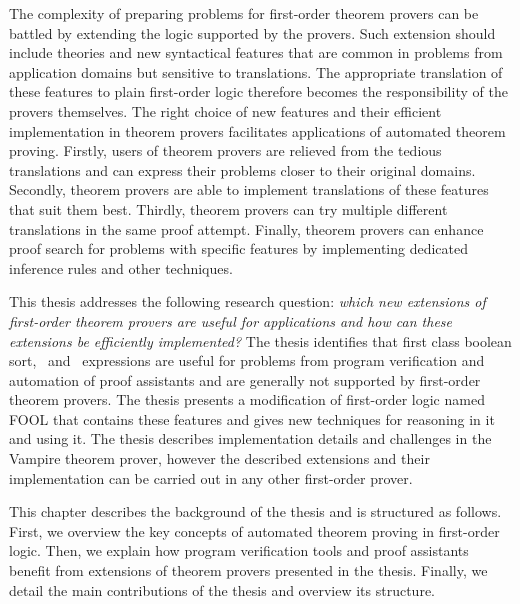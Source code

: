 The complexity of preparing problems for first-order theorem provers can be battled by extending the logic supported by the provers. Such extension should include theories and new syntactical features that are common in problems from application domains but sensitive to translations. The appropriate translation of these features to plain first-order logic therefore becomes the responsibility of the provers themselves. The right choice of new features and their efficient implementation in theorem provers facilitates applications of automated theorem proving. Firstly, users of theorem provers are relieved from the tedious translations and can express their problems closer to their original domains. Secondly, theorem provers are able to implement translations of these features that suit them best. Thirdly, theorem provers can try multiple different translations in the same proof attempt. Finally, theorem provers can enhance proof search for problems with specific features by implementing dedicated inference rules and other techniques.

This thesis addresses the following research question: \emph{which new extensions of first-order theorem provers are useful for applications and how can these extensions be efficiently implemented?} The thesis identifies that first class boolean sort, \ITE\ and \LETIN\ expressions are useful for problems from program verification and automation of proof assistants and are generally not supported by first-order theorem provers. The thesis presents a modification of first-order logic named FOOL that contains these features and gives new techniques for reasoning in it and using it. The thesis describes implementation details and challenges in the Vampire theorem prover, however the described extensions and their implementation can be carried out in any other first-order prover.

This chapter describes the background of the thesis and is structured as follows. First, we overview the key concepts of automated theorem proving in first-order logic. Then, we explain how program verification tools and proof assistants benefit from extensions of theorem provers presented in the thesis. Finally, we detail the main contributions of the thesis and overview its structure.


